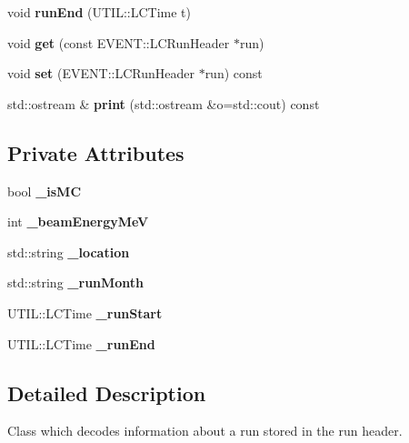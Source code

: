 \begin{DoxyCompactItemize}
\item 
void {\bfseries run\-End} (U\-T\-I\-L\-::\-L\-C\-Time t)\label{classRunInformation_ad5338dceec438281d98866a6416e148d}

\item 
void {\bfseries get} (const E\-V\-E\-N\-T\-::\-L\-C\-Run\-Header $\ast$run)\label{classRunInformation_ac6c3b16064852dfb9cf53d87f30d4dcc}

\item 
void {\bfseries set} (E\-V\-E\-N\-T\-::\-L\-C\-Run\-Header $\ast$run) const \label{classRunInformation_ac6d0c69ff29c2839e1ab34c1dba46050}

\item 
std\-::ostream \& {\bfseries print} (std\-::ostream \&o=std\-::cout) const \label{classRunInformation_aa1da2b6f960929a0b520df50ff757754}

\end{DoxyCompactItemize}
\subsection*{Private Attributes}
\begin{DoxyCompactItemize}
\item 
bool {\bfseries \-\_\-is\-M\-C}\label{classRunInformation_ae3b42f3aa7e5aa620d616740d0ae0f08}

\item 
int {\bfseries \-\_\-beam\-Energy\-Me\-V}\label{classRunInformation_af1a7c2459c3c98dba0313148d726ae77}

\item 
std\-::string {\bfseries \-\_\-location}\label{classRunInformation_a6d90d756c207a9782c39bb70bd0a7f62}

\item 
std\-::string {\bfseries \-\_\-run\-Month}\label{classRunInformation_a7d58476f3f968fe0a0393ecfcf0d338c}

\item 
U\-T\-I\-L\-::\-L\-C\-Time {\bfseries \-\_\-run\-Start}\label{classRunInformation_a3b743376f135df602865a20c12080e92}

\item 
U\-T\-I\-L\-::\-L\-C\-Time {\bfseries \-\_\-run\-End}\label{classRunInformation_a9a04bb6a9b5113d87ef6fbf3fb7b3656}

\end{DoxyCompactItemize}


\subsection{Detailed Description}
Class which decodes information about a run stored in the run header. 

